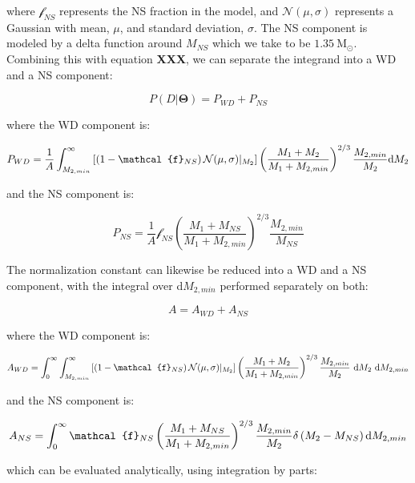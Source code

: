 \documentclass[letterpaper,12pt,preprint]{aastex}
\newcommand{\Msun}{\mathrm{M}_\odot}
\begin{document}
where $\mathcal{f}_{NS}$ represents the NS fraction in the model, and $\mathcal{N}(\mu , \sigma)$ represents a Gaussian with mean, $\mu$, and standard deviation, $\sigma$. The NS component is modeled by a delta function around $M_{NS}$ which we take to be $1.35 ~\Msun$. Combining this with equation {\bf XXX}, we can separate the integrand into a WD and a NS component:

\begin{equation}
P(D|\mathbf{\Theta}) = P_{WD} + P_{NS}
\end{equation}

where the WD component is:

\begin{equation}
P_{WD} = \frac{1}{A} \int_{M_{2,min}}^{\infty} \left[ \left( 1-\mathcal{f}_{NS} \right) \mathcal{N}(\mu , \sigma)|_{M_2} \right]  \left( \frac{M_1 + M_2}{M_1 + M_{2,min}} \right)^{2/3} \frac{M_{2,min}}{M_2} {\rm d}M_2 
\end{equation}

and the NS component is:

\begin{equation}
P_{NS} = \frac{1}{A} \mathcal{f}_{NS}\left( \frac{M_1 + M_{NS}}{M_1 + M_{2,min}} \right)^{2/3} \frac{M_{2,min}}{M_{NS}}
\end{equation}

The normalization constant can likewise be reduced into a WD and a NS component, with the integral over d$M_{2,min}$ performed separately on both:

\begin{equation}
A = A_{WD} + A_{NS}
\end{equation}

where the WD component is:

\begin{equation}
A_{WD} = \int_0^{\infty} \int_{M_{2,min}}^{\infty} \left[ \left( 1-\mathcal{f}_{NS} \right) \mathcal{N}(\mu , \sigma)|_{M_2} \right]  \left( \frac{M_1 + M_2}{M_1 + M_{2,min}} \right)^{2/3} \frac{M_{2,min}}{M_2}\ {\rm d}M_2\ {\rm d}M_{2,min}
\end{equation}

and the NS component is:

\begin{equation}
A_{NS} = \int_0^{\infty} \mathcal{f}_{NS}\left( \frac{M_1 + M_{NS}}{M_1 + M_{2,min}} \right)^{2/3} \frac{M_{2,min}}{M_2} \delta \left( M_2 - M_{NS} \right) {\rm d}M_{2,min}
\end{equation}

which can be evaluated analytically, using integration by parts:
\end{document}
